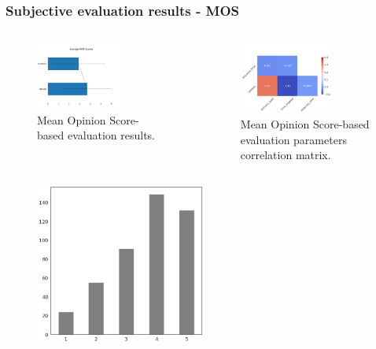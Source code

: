 \documentclass[a4paper,9pt]{beamer}
\theoremstyle{mytheoremstyle}
\begin{document}
\begin{frame}
\frametitle{Subjective evaluation results - MOS}
\begin{columns}
\begin{figure}
\begin{center}
  \includegraphics[width=0.7\textwidth]{res/MOS-answer}
\end{center}
	\caption{Mean Opinion Score-based evaluation results.}
\end{figure}
\begin{figure}
\begin{center}
\includegraphics[width=0.7\textwidth]{res/MOS_correlation_matrix}
\end{center}
\caption{Mean Opinion Score-based evaluation parameters correlation matrix.}
\end{figure}
\end{columns}
\begin{columns}
\begin{figure}
\begin{center}
\includegraphics[width=0.5\textwidth]{res/MOS_number_of_scores_natural_stimuli}

\end{center}
\end{figure}
\end{columns}
\end{frame}
\end{document}
